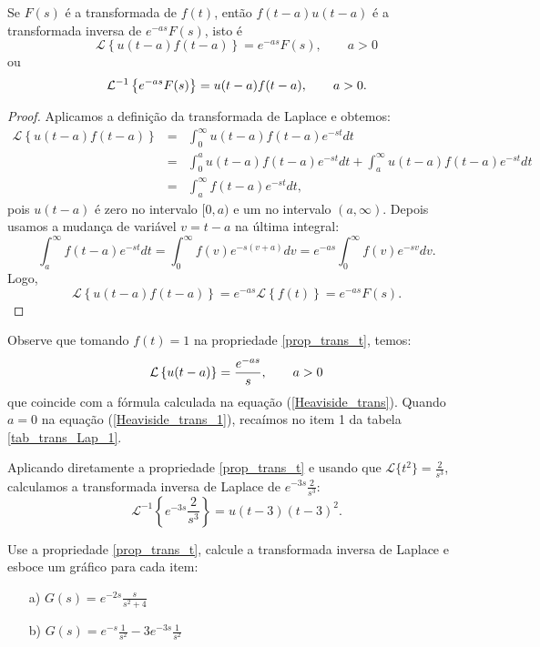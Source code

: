 \begin{propr}{\label{prop_trans_t}}Se $F(s)$ é a transformada de $f(t)$, então $f(t-a)u(t-a)$ é a transformada inversa de $e^{-as}F(s)$, isto é
\begin{equation}
\mathcal{L}\left\{u(t-a)f(t-a)\right\} =e^{-as}F(s),\qquad a>0
\end{equation}
ou
\begin{equation}{\label{eq_trans_t_inv}}
\mathcal{L}^{-1} \left\{e^{-as}F(s)\right\} =u(t-a)f(t-a),\qquad a>0.
\end{equation} 
\end{propr}
\begin{proof}Aplicamos a definição da transformada de Laplace e obtemos:
\begin{eqnarray*}
\mathcal{L}\left\{u(t-a)f(t-a)\right\}&=&\int_0^\infty u(t-a)f(t-a)e^{-st}dt\\
&=&\int_0^a u(t-a)f(t-a)e^{-st}dt+\int_a^\infty u(t-a)f(t-a)e^{-st}dt\\
&=&\int_a^\infty f(t-a)e^{-st}dt,
\end{eqnarray*}
pois $u(t-a)$ é zero no intervalo $[0,a)$ e um no intervalo $(a,\infty)$. Depois usamos a mudança de variável $v=t-a$ na última integral:
\begin{equation*}
\int_a^\infty f(t-a)e^{-st}dt=\int_0^\infty f(v)e^{-s(v+a)}dv=e^{-as}\int_0^\infty f(v)e^{-sv}dv.
\end{equation*}
Logo,
$$
\mathcal{L}\left\{u(t-a)f(t-a)\right\}=e^{-as}\mathcal{L}\left\{f(t)\right\}=e^{-as}F(s).
$$
\end{proof}
Observe que tomando $f(t)=1$ na propriedade \ref{prop_trans_t}, temos:
\begin{equation}{\label{Heaviside_trans_1}}
\mathcal{L}\left\{u(t-a)\right\} =\frac{e^{-as}}{s},\qquad a>0
\end{equation}
que coincide com a fórmula calculada na equação (\ref{Heaviside_trans}). Quando $a=0$ na equação (\ref{Heaviside_trans_1}), recaímos no item 1 da tabela \ref{tab_trans_Lap_1}.
\begin{ex} Aplicando diretamente a propriedade \ref{prop_trans_t} e usando que $\mathcal{L}\{t^2\}=\frac{2}{s^3}$, calculamos a transformada inversa de Laplace de $e^{-3s}\frac{2}{s^3}$:
$$
\mathcal{L}^{-1}\left\{e^{-3s}\frac{2}{s^3}\right\}=u(t-3)(t-3)^2.
$$
\end{ex}
\begin{prob}Use a propriedade \ref{prop_trans_t}, calcule a transformada inversa de Laplace e esboce um gráfico para cada item:
\begin{itemize}
\item[a)] $G(s)=e^{-2s}\frac{s}{s^2+4}$
\item[b)] $G(s)=e^{-s}\frac{1}{s^2}-3e^{-3s}\frac{1}{s^2}$
\end{itemize}
\end{prob}

